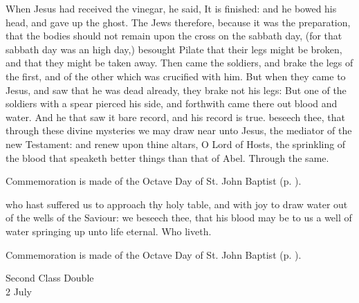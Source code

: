  When Jesus had received the vinegar, he said, It is finished: and he bowed his head, and gave up the ghost. The Jews therefore, because it was the preparation, that the bodies should not remain upon the cross on the sabbath day, (for that sabbath day was an high day,) besought Pilate that their legs might be broken, and that they might be taken away. Then came the soldiers, and brake the legs of the first, and of the other which was crucified with him. But when they came to Jesus, and saw that he was dead already, they brake not his legs: But one of the soldiers with a spear pierced his side, and forthwith came there out blood and water. And he that saw it bare record, and his record is true.
\secret
{} beseech thee, that through these divine mysteries we may draw near unto Jesus, the mediator of the new Testament: and renew upon thine altars, O Lord of Hosts, the sprinkling of the blood that speaketh better things than that of Abel. Through the same.
\begin{rubric}
    Commemoration is made of the Octave Day of St. John Baptist (p. \pageref{StJohnBaptist}).
\end{rubric}
\postcommunion
{} who hast suffered us to approach thy holy table, and with joy to draw water out of the wells of the Saviour: we beseech thee, that his blood may be to us a well of water springing up unto life eternal. Who liveth.
\begin{rubric}
    Commemoration is made of the Octave Day of St. John Baptist (p. \pageref{StJohnBaptist}).
\end{rubric}


\begin{inhead}
    {Second Class Double\\
2 July}
\end{inhead}
\par\noindent
{}


